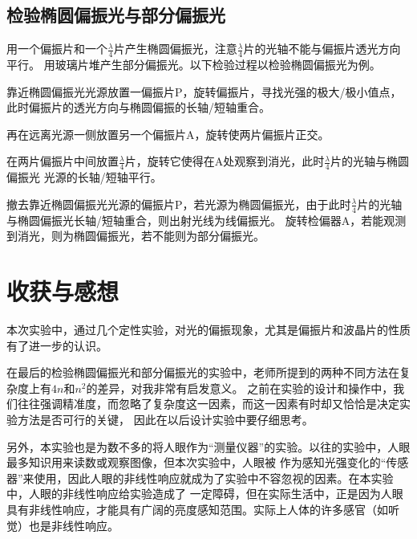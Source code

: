 \documentclass{article}
\begin{document}
    \subsection{检验椭圆偏振光与部分偏振光}
    用一个偏振片和一个$\frac{\lambda}{4}$片产生椭圆偏振光，注意$\frac{\lambda}{4}$片的光轴不能与偏振片透光方向平行。
    用玻璃片堆产生部分偏振光。以下检验过程以检验椭圆偏振光为例。

    靠近椭圆偏振光光源放置一偏振片P，旋转偏振片，寻找光强的极大/极小值点，此时偏振片的透光方向与椭圆偏振的长轴/短轴重合。

    再在远离光源一侧放置另一个偏振片A，旋转使两片偏振片正交。

    在两片偏振片中间放置$\frac{\lambda}{4}$片，旋转它使得在A处观察到消光，此时$\frac{\lambda}{4}$片的光轴与椭圆偏振光
    光源的长轴/短轴平行。

    撤去靠近椭圆偏振光光源的偏振片P，若光源为椭圆偏振光，由于此时$\frac{\lambda}{4}$片的光轴与椭圆偏振光长轴/短轴重合，则出射光线为线偏振光。
    旋转检偏器A，若能观测到消光，则为椭圆偏振光，若不能则为部分偏振光。

    \section{收获与感想}
    本次实验中，通过几个定性实验，对光的偏振现象，尤其是偏振片和波晶片的性质有了进一步的认识。

    在最后的检验椭圆偏振光和部分偏振光的实验中，老师所提到的两种不同方法在复杂度上有$4n$和$n^2$的差异，对我非常有启发意义。
    之前在实验的设计和操作中，我们往往强调精准度，而忽略了复杂度这一因素，而这一因素有时却又恰恰是决定实验方法是否可行的关键，
    因此在以后设计实验中要仔细思考。

    另外，本实验也是为数不多的将人眼作为“测量仪器”的实验。以往的实验中，人眼最多知识用来读数或观察图像，但本次实验中，人眼被
    作为感知光强变化的“传感器”来使用，因此人眼的非线性响应就成为了实验中不容忽视的因素。在本实验中，人眼的非线性响应给实验造成了
    一定障碍，但在实际生活中，正是因为人眼具有非线性响应，才能具有广阔的亮度感知范围。实际上人体的许多感官（如听觉）也是非线性响应。
 
\end{document}
